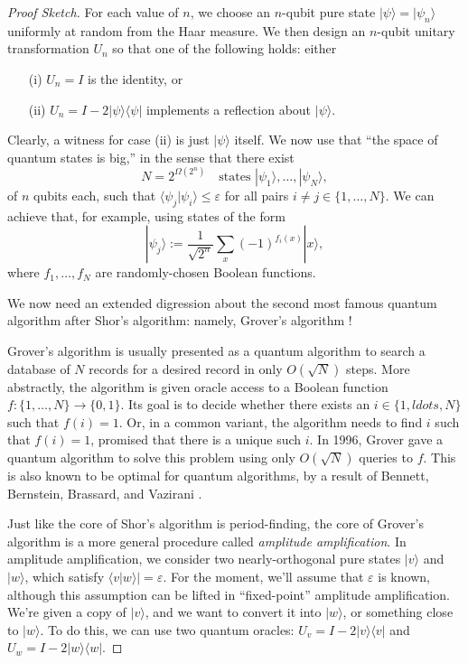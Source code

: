 \documentclass[11pt]{report}
\theoremstyle{plain}
\theoremstyle{definition}
\renewcommand{\bra}[1]{\langle#1|}
\renewcommand{\ket}[1]{|#1\rangle}
\newcommand{\braket}[2]{\langle#1|#2\rangle}
\begin{document}
\begin{proof}[Proof Sketch]
  For each value of $n$, we choose an $n$-qubit pure state $\ket{\psi}=\ket{\psi_n}$ uniformly at random from the
  Haar measure.  We then design an $n$-qubit unitary transformation $U_n$ so that one of the following holds: either
\begin{enumerate}
\item[(i)] $U_n =I$ is the identity, or
\item[(ii)] $U_n =I- 2 \ket{\psi}\bra{\psi}$ implements a reflection about $\ket{\psi}$.
\end{enumerate}
Clearly, a witness for case (ii) is just $\ket{\psi}$ itself.
  We now use that ``the space of quantum states is big,'' in the sense that there exist
   $$ N = 2^{\Omega ( 2^n)}  \hspace{1em} \text{states }
    \ket{ \psi_1}, \ldots, \ket{ \psi_N }, $$
  of $n$ qubits each, such that $\braket{ \psi_j}{ \psi_i} \leq \varepsilon$ for all
  pairs $i \neq j \in \{ 1, \ldots, N \}$.  We can achieve that, for example, using states of the form
  \[
  \ket{ \psi_j } := \frac{1}{\sqrt{2^n}} \sum_x ( - 1)^{f_i ( x)} \ket{ x},
  \]
  where $f_1, \ldots, f_N$ are randomly-chosen Boolean functions.

  We now need an extended digression about the second most famous quantum algorithm after Shor's algorithm: namely, Grover's algorithm \cite{grover}!

  Grover's algorithm is usually presented as a quantum algorithm to search a database of $N$ records for a desired record in only $O(\sqrt{N})$ steps.  More abstractly, the algorithm
  is given oracle access to a Boolean function $f : \{ 1, \ldots, N \} \rightarrow \{ 0, 1 \}$.  Its goal is to decide whether there exists an $i\in \{ 1,ldots,N\}$ such that $f ( i) = 1$. Or, in a common variant, the algorithm needs to find $i$ such that $f(i)=1$, promised that there is a unique such $i$.  In 1996, Grover \cite{grover} gave a quantum algorithm to solve this problem using only $O ( \sqrt{N} )$ queries
  to $f$.  This is also known to be optimal for quantum algorithms, by a result of Bennett, Bernstein, Brassard, and Vazirani \cite{bbbv}.

  Just like the core of Shor's algorithm is period-finding, the core of Grover's algorithm is a more general procedure called {\em amplitude amplification}.  In amplitude amplification,
  we consider two nearly-orthogonal pure states $\ket{ v }$ and $\ket{ w }$, which satisfy
  $\braket{ v }{ w } | = \varepsilon$.
  For the moment, we'll assume that $\varepsilon$ is known, although this assumption can be lifted in ``fixed-point'' amplitude amplification.  We're given a copy of $\ket{v}$, and
  we want to convert it into $\ket{w}$, or something close to $\ket{w}$.  To do this, we can use two quantum oracles: $U_v = I- 2 \ket{v}\bra{v}$ and $U_w = I- 2 \ket{w}\bra{w}$.


\end{proof}
\end{document}
